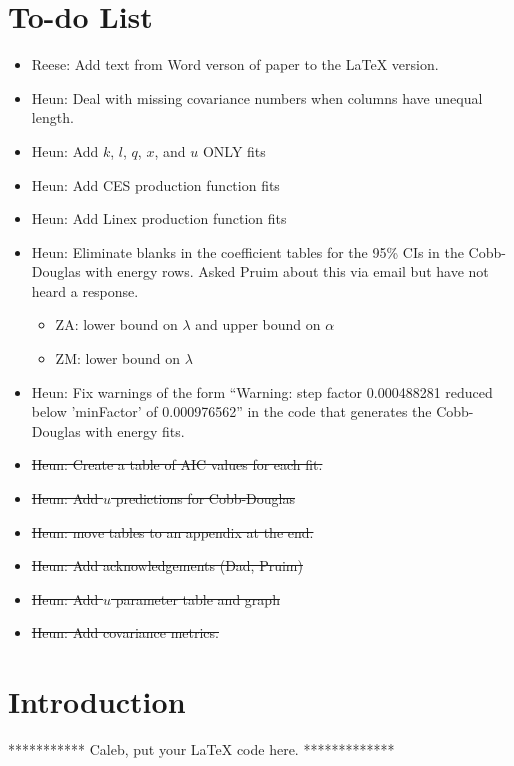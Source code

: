 \documentclass[preprint,authoryear,12pt]{elsarticle}\usepackage{graphicx, color}
\begin{document}
\section*{To-do List}
\begin{itemize}
\item Reese: Add text from Word verson of paper to the LaTeX version.
\item Heun: Deal with missing covariance numbers when columns have unequal length.
\item Heun: Add $k$, $l$, $q$, $x$, and $u$ ONLY fits
\item Heun: Add CES production function fits
\item Heun: Add Linex production function fits
\item Heun: Eliminate blanks in the coefficient tables for the 95\% CIs in the Cobb-Douglas with energy rows. Asked Pruim about this via email but have not heard a response.
      \begin{itemize}
      \item ZA: lower bound on $\lambda$ and upper bound on $\alpha$
      \item ZM: lower bound on $\lambda$
      \end{itemize}
\item Heun: Fix warnings of the form ``Warning:  step factor 0.000488281 reduced below ’minFactor’ of 0.000976562'' in the code that generates the Cobb-Douglas with energy fits.
\item \st{Heun: Create a table of AIC values for each fit.}
\item \st{Heun: Add $u$ predictions for Cobb-Douglas}
\item \st{Heun: move tables to an appendix at the end.}
\item \st{Heun: Add acknowledgements (Dad, Pruim)}
\item \st{Heun: Add $u$ parameter table and graph}
\item \st{Heun: Add covariance metrics.}
\end{itemize}

\section{Introduction}

*********** Caleb, put your LaTeX code here. *************
\end{document}
